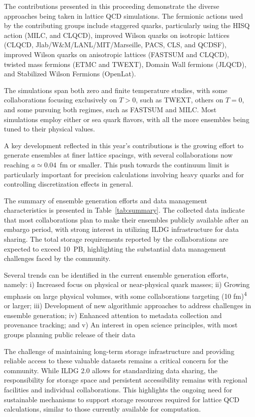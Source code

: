 \documentclass[a4paper,11pt]{article}
\begin{document}
The contributions presented in this proceeding demonstrate the diverse
approaches being taken in lattice QCD simulations. The fermionic
actions used by the contributing groups include staggered quarks,
particularly using the HISQ action (MILC, and CLQCD), improved
Wilson quarks on isotropic lattices (CLQCD,
Jlab/W\&M/LANL/MIT/Marseille, PACS, CLS, and QCDSF), improved Wilson
quarks on anisotropic lattices (FASTSUM and CLQCD), twisted mass
fermions (ETMC and TWEXT), Domain Wall fermions (JLQCD),
and Stabilized Wilson Fermions (OpenLat).

The simulations span both zero and finite temperature studies, with
some collaborations focusing exclusively on $T > 0$, such as TWEXT,
others on $T = 0$, and some pursuing both regimes, such as FASTSUM and
MILC. Most simulations employ either  or  sea
quark flavors, with all the more ensembles being tuned to their
physical values.

A key development reflected in this year's contributions is the
growing effort to generate ensembles at finer lattice spacings, with
several collaborations now reaching $a\simeq0.04$~fm or smaller. This
push towards the continuum limit is particularly important for
precision calculations involving heavy quarks and for controlling
discretization effects in general.

The summary of ensemble generation efforts and data management
characteristics is presented in Table~\ref{tab:summary}. The collected
data indicate that most collaborations plan to make their ensembles
publicly available after an embargo period, with strong interest in
utilizing ILDG infrastructure for data sharing. The total storage
requirements reported by the collaborations are expected to exceed
10~PB, highlighting the substantial data management challenges faced
by the community.

Several trends can be identified in the current ensemble generation
efforts, namely: i) Increased focus on physical or near-physical quark
masses; ii) Growing emphasis on large physical volumes, with some
collaborations targeting (10 fm)\textsuperscript{4} or larger; iii)
Development of new algorithmic approaches to address challenges in
ensemble generation; iv) Enhanced attention to metadata collection and
provenance tracking; and v) An interest in open science principles,
with most groups planning public release of their data

The challenge of maintaining long-term storage infrastructure and
providing reliable access to these valuable datasets remains a
critical concern for the community. While ILDG 2.0 allows for
standardizing data sharing, the responsibility for storage space and
persistent accessibility remains with regional facilities and
individual collaborations. This highlights the ongoing need for
sustainable mechanisms to support storage resources required for
lattice QCD calculations, similar to those currently available for
computation.
\end{document}
